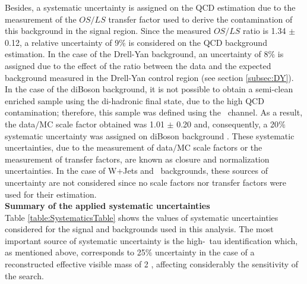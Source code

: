 \noindent Besides, a systematic uncertainty is assigned on the QCD estimation due to 
the measurement of the $OS/LS$ transfer factor used to derive the contamination 
of this background in the signal region. Since the measured $OS/LS$ ratio 
is 1.34 $\pm$ 0.12, a relative uncertainty of 9$\%$ is considered on 
the QCD background estimation. In the case of the Drell-Yan 
background, an uncertainty of 8$\%$ is assigned due to the effect of the 
ratio between the data and the expected background measured in the Drell-Yan 
control region (see section \ref{subsec:DY}). In the case of the diBoson background, it is
not possible to obtain a semi-clean enriched sample using the di-hadronic final state, due to the high 
QCD contamination; therefore, this sample was defined using the 
\Zprimetoemu~channel. As a result, the data$/$MC scale factor obtained 
was 1.01 $\pm$ 0.20 and, consequently, a 20$\%$ systematic uncertainty was assigned
on diBoson background \cite{ZaixingThesis}. These systematic uncertainties,
due to the measurement of data$/$MC scale factors or the measurement of 
transfer factors, are known as closure and normalization uncertainties. In the case of 
W+Jets and \ttbar~backgrounds, these sources of uncertainty are not considered since 
no scale factors nor transfer factors were used for their estimation. \\

\textbf{Summary of the applied systematic uncertainties}\\

\noindent Table \ref{table:SystematicsTable} shows the values of systematic
uncertainties considered for the signal and backgrounds used in this analysis. The most 
important source of systematic uncertainty is the high-\pt~tau identification which, as 
mentioned above, corresponds to 25$\%$ uncertainty in the case of a reconstructed 
effective visible mass of 2 \TeV, affecting considerably the sensitivity of the search.


